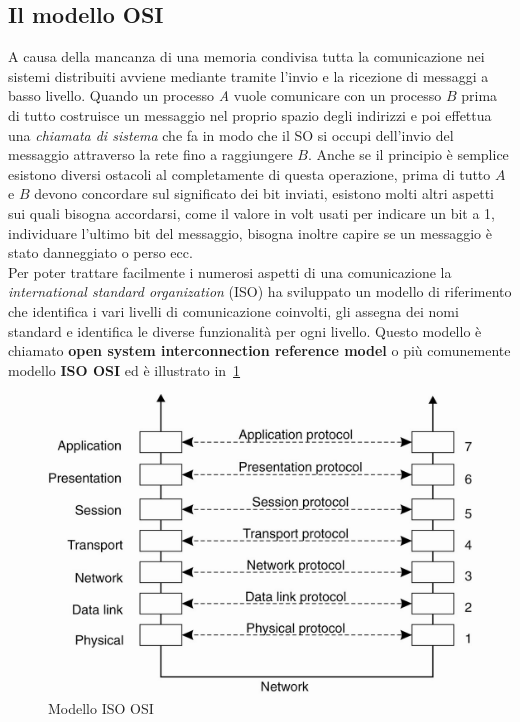 \subsection{Il modello OSI}
A causa della mancanza di una memoria condivisa tutta la comunicazione nei sistemi distribuiti avviene mediante tramite l'invio e la ricezione di messaggi a basso livello. Quando un processo \emph{A} vuole comunicare con un processo $B$ prima di tutto costruisce un messaggio nel proprio spazio degli indirizzi e poi effettua una \emph{chiamata di sistema} che fa in modo che il SO si occupi dell'invio del messaggio attraverso la rete fino a raggiungere $B$. Anche se il principio è semplice esistono diversi ostacoli al completamente di questa operazione, prima di tutto $A$ e $B$ devono concordare sul significato dei bit inviati, esistono molti altri aspetti sui quali bisogna accordarsi, come il valore in volt usati per indicare un bit a 1, individuare l'ultimo bit del messaggio, bisogna inoltre capire se un messaggio è stato danneggiato o perso ecc.\\
Per poter trattare facilmente i numerosi aspetti di una comunicazione la \emph{international standard organization} (ISO) ha sviluppato un modello di riferimento che identifica i vari livelli di comunicazione coinvolti, gli assegna dei nomi standard e identifica le diverse funzionalità per ogni livello. Questo modello è chiamato \textbf{open system interconnection reference model} o più comunemente modello \textbf{ISO OSI} ed è illustrato in \figurename\,\ref{img:osi}
\begin{figure}[htb]
\centering
\includegraphics[scale=0.4]{img/osi.png}
\caption{Modello ISO OSI}\label{img:osi}
\end{figure}
